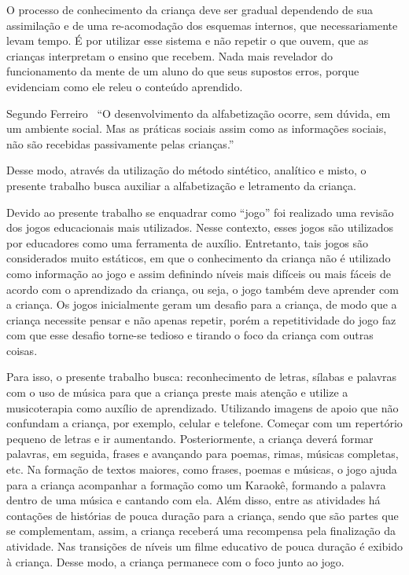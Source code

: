 \documentclass{sigchi}
\begin{document}
O processo de conhecimento da criança deve ser gradual dependendo de sua assimilação e de uma re-acomodação dos esquemas internos, que necessariamente levam tempo. É por utilizar esse sistema e não repetir o que ouvem, que as crianças interpretam o ensino que recebem. Nada mais revelador do funcionamento da mente de um aluno do que seus supostos erros, porque evidenciam como ele releu o conteúdo aprendido.

Segundo Ferreiro~\cite{ferreiro1996alfabetizacao} “O desenvolvimento da alfabetização ocorre, sem dúvida, em um ambiente social. Mas as práticas sociais assim como as informações sociais, não são recebidas passivamente pelas crianças.”

Desse modo, através da utilização do método sintético, analítico e misto, o presente trabalho busca auxiliar a alfabetização e letramento da criança. 

Devido ao presente trabalho se enquadrar como ``jogo'' foi realizado uma revisão dos jogos educacionais mais utilizados. Nesse contexto, esses jogos são utilizados por educadores como uma ferramenta de auxílio. Entretanto, tais jogos são considerados muito estáticos, em que o conhecimento da criança não é utilizado como informação ao jogo e assim definindo níveis mais difíceis ou mais fáceis de acordo com o aprendizado da criança, ou seja, o jogo também deve aprender com a criança. Os jogos inicialmente geram um desafio para a criança, de modo que a criança necessite pensar e não apenas repetir, porém a repetitividade do jogo faz com que esse desafio torne-se tedioso e tirando o foco da criança com outras coisas.

Para isso, o presente trabalho busca: reconhecimento de letras, sílabas e palavras com o uso de música para que a criança preste mais atenção e utilize a musicoterapia como auxílio de aprendizado. Utilizando imagens de apoio que não confundam a criança, por exemplo, celular e telefone. Começar com um repertório pequeno de letras e ir aumentando. Posteriormente, a criança deverá formar palavras, em seguida, frases e avançando para poemas, rimas, músicas completas, etc. Na formação de textos maiores, como frases, poemas e músicas, o jogo ajuda para a criança acompanhar a formação como um Karaokê, formando a palavra dentro de uma música e cantando com ela. Além disso, entre as atividades há contações de histórias de pouca duração para a criança, sendo que são partes que se complementam, assim, a criança receberá uma recompensa pela finalização da atividade. Nas transições de níveis um filme educativo de pouca duração é exibido à criança. Desse modo, a criança permanece com o foco junto ao jogo. 
\end{document}
